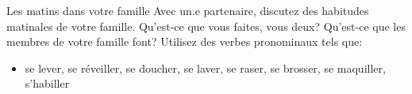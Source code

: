 \begin{frame}{Les matins dans votre famille}
  Avec un.e partenaire, discutez des habitudes matinales de votre famille.
  Qu'est-ce que vous faites, vous deux?
  Qu'est-ce que les membres de votre famille font?
  Utilisez des verbes pronominaux tels que:
  \begin{itemize}
    \item se lever, se réveiller, se doucher, se laver, se raser, se brosser, se maquiller, s'habiller
  \end{itemize}
\end{frame}